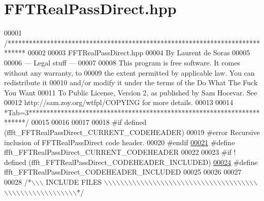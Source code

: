 \hypertarget{a00101_source}{\section{F\+F\+T\+Real\+Pass\+Direct.\+hpp}
\label{a00101_source}
}

\begin{DoxyCode}
00001 \textcolor{comment}{/*****************************************************************************}
00002 \textcolor{comment}{}
00003 \textcolor{comment}{        FFTRealPassDirect.hpp}
00004 \textcolor{comment}{        By Laurent de Soras}
00005 \textcolor{comment}{}
00006 \textcolor{comment}{--- Legal stuff ---}
00007 \textcolor{comment}{}
00008 \textcolor{comment}{This program is free software. It comes without any warranty, to}
00009 \textcolor{comment}{the extent permitted by applicable law. You can redistribute it}
00010 \textcolor{comment}{and/or modify it under the terms of the Do What The Fuck You Want}
00011 \textcolor{comment}{To Public License, Version 2, as published by Sam Hocevar. See}
00012 \textcolor{comment}{http://sam.zoy.org/wtfpl/COPYING for more details.}
00013 \textcolor{comment}{}
00014 \textcolor{comment}{*Tab=3***********************************************************************/}
00015 
00016 
00017 
00018 \textcolor{preprocessor}{#if defined (ffft\_FFTRealPassDirect\_CURRENT\_CODEHEADER)}
00019 \textcolor{preprocessor}{    #error Recursive inclusion of FFTRealPassDirect code header.}
00020 \textcolor{preprocessor}{#endif}
\hypertarget{a00101_source_l00021}{}\hyperlink{a00101_a882a25e184584d9844f646417865d478}{00021} \textcolor{preprocessor}{#define ffft\_FFTRealPassDirect\_CURRENT\_CODEHEADER}
00022 
00023 \textcolor{preprocessor}{#if ! defined (ffft\_FFTRealPassDirect\_CODEHEADER\_INCLUDED)}
\hypertarget{a00101_source_l00024}{}\hyperlink{a00101_a52ec25590b9f985b99eb92f6ac7567b2}{00024} \textcolor{preprocessor}{#define ffft\_FFTRealPassDirect\_CODEHEADER\_INCLUDED}
00025 
00026 
00027 
00028 \textcolor{comment}{/*\(\backslash\)\(\backslash\)\(\backslash\) INCLUDE FILES \(\backslash\)\(\backslash\)\(\backslash\)\(\backslash\)\(\backslash\)\(\backslash\)\(\backslash\)\(\backslash\)\(\backslash\)\(\backslash\)\(\backslash\)\(\backslash\)\(\backslash\)\(\backslash\)\(\backslash\)\(\backslash\)\(\backslash\)\(\backslash\)\(\backslash\)\(\backslash\)\(\backslash\)\(\backslash\)\(\backslash\)\(\backslash\)\(\backslash\)\(\backslash\)\(\backslash\)\(\backslash\)\(\backslash\)\(\backslash\)\(\backslash\)\(\backslash\)\(\backslash\)\(\backslash\)\(\backslash\)\(\backslash\)\(\backslash\)\(\backslash\)\(\backslash\)\(\backslash\)\(\backslash\)\(\backslash\)\(\backslash\)\(\backslash\)\(\backslash\)\(\backslash\)\(\backslash\)\(\backslash\)\(\backslash\)\(\backslash\)\(\backslash\)\(\backslash\)\(\backslash\)\(\backslash\)\(\backslash\)\(\backslash\)*/}

\end{DoxyCode}
